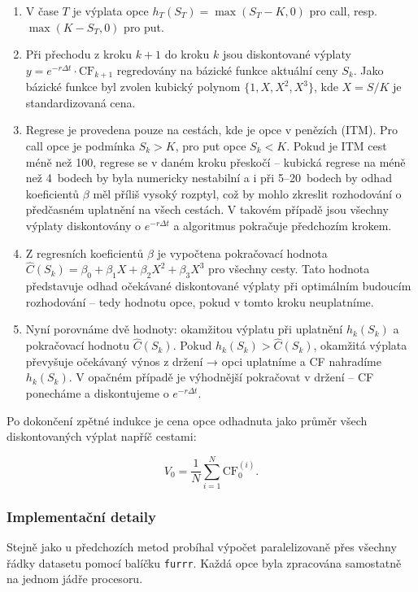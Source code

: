 \begin{enumerate}
  \item V čase \(T\) je výplata opce \(h_T(S_T) = \max(S_T - K, 0)\) pro call, resp. \(\max(K - S_T, 0)\) pro put.
  \item Při přechodu z kroku \(k+1\) do kroku \(k\) jsou diskontované výplaty \(y = e^{-r\Delta t} \cdot \text{CF}_{k+1}\) regredovány na bázické funkce aktuální ceny \(S_k\). Jako bázické funkce byl zvolen kubický polynom \(\{1, X, X^2, X^3\}\), kde \(X = S/K\) je standardizovaná cena.
  \item Regrese je provedena pouze na cestách, kde je opce v penězích (ITM). Pro call opce je podmínka \(S_k > K\), pro put opce \(S_k < K\). Pokud je ITM cest méně než 100, regrese se v daném kroku přeskočí – kubická regrese na méně než 4~bodech by byla numericky nestabilní a i při 5--20~bodech by odhad koeficientů \(\beta\) měl příliš vysoký rozptyl, což by mohlo zkreslit rozhodování o předčasném uplatnění na všech cestách. V takovém případě jsou všechny výplaty diskontovány o \(e^{-r\Delta t}\) a algoritmus pokračuje předchozím krokem.
  \item Z regresních koeficientů \(\beta\) je vypočtena pokračovací hodnota \(\hat{C}(S_k) = \beta_0 + \beta_1 X + \beta_2 X^2 + \beta_3 X^3\) pro všechny cesty. Tato hodnota představuje odhad očekávané diskontované výplaty při optimálním budoucím rozhodování – tedy hodnotu opce, pokud v tomto kroku neuplatníme.
  \item Nyní porovnáme dvě hodnoty: okamžitou výplatu při uplatnění \(h_k(S_k)\) a pokračovací hodnotu \(\hat{C}(S_k)\). Pokud \(h_k(S_k) > \hat{C}(S_k)\), okamžitá výplata převyšuje očekávaný výnos z držení → opci uplatníme a CF nahradíme \(h_k(S_k)\). V opačném případě je výhodnější pokračovat v držení – CF ponecháme a diskontujeme o \(e^{-r\Delta t}\).
\end{enumerate}

Po dokončení zpětné indukce je cena opce odhadnuta jako průměr všech diskontovaných výplat napříč cestami:

\[
V_0 = \frac{1}{N} \sum_{i=1}^{N} \text{CF}_0^{(i)}.
\]

\subsubsection{Implementační detaily}

Stejně jako u předchozích metod probíhal výpočet paralelizovaně přes všechny řádky datasetu pomocí balíčku \texttt{furrr}. Každá opce byla zpracována samostatně na jednom jádře procesoru.

